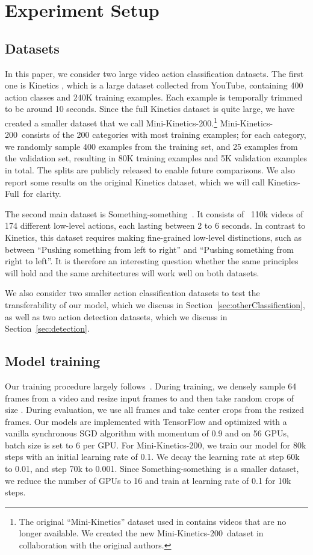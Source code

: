 \documentclass[runningheads]{llncs}
\newcommand{\MK}{Mini-Kinetics-200}
\newcommand{\Something}{Something-something}
\newcommand{\FK}{Kinetics-Full}
\begin{document}
 
\section{Experiment Setup}
\label{sec:experiments}
\subsection{Datasets}
\label{data}

In this paper, we consider two large video action classification datasets.
The first one is Kinetics \cite{kay2017kinetics},
  which  is a large dataset collected from YouTube,  containing 400 action classes and 240K training examples.
  Each example is temporally trimmed to be around 10 seconds.
  Since the full Kinetics dataset is quite large, 
  we have created a smaller dataset
that we call \MK.\footnote{
The original ``Mini-Kinetics'' dataset used in 
 \cite{kay2017kinetics} contains videos that are no longer available.
 We created the new \MK\ dataset in collaboration with the original authors.
} \MK\ consists of 
the 200 categories with most training examples;
for each category, we randomly sample 400 examples from the training set, and 25 examples from the validation set,
resulting in
80K training examples and 5K validation examples in total. The splits are publicly released to enable future comparisons.
We also report some results on the original Kinetics dataset, which we will call \FK\ for clarity.

The second main dataset is
\Something~\cite{Something}. It consists of ~110k videos of 174 different low-level actions, each lasting  between 2 to 6 seconds.
In contrast to Kinetics,
this dataset requires making fine-grained low-level distinctions, such as between ``Pushing something from left to right'' and ``Pushing something from right to left''.
It is therefore an interesting question whether the same principles will hold and the same architectures will work well on both datasets.

We also consider two 
smaller action classification datasets to test the transferability of our model, 
which we discuss in Section~\ref{sec:otherClassification},
as well as two 
action detection datasets, which we discuss in Section~\ref{sec:detection}.


\subsection{Model training}

Our training procedure largely follows~\cite{carreira2017quo}. During training, we densely sample 64 frames from a video and resize input frames to  and then take random crops of size . During evaluation, we use all frames and take  center crops from the resized frames. Our models are implemented with TensorFlow and optimized with a vanilla synchronous SGD algorithm with momentum of 0.9 and on 56 GPUs, batch size is set to 6 per GPU. For \MK, we train our model for 80k steps with an initial learning rate of 0.1. We decay the learning rate at step 60k to 0.01, and step 70k to 0.001. Since \Something\ is a smaller dataset, we reduce the number of GPUs to 16 and train at learning rate of 0.1 for 10k steps.
\end{document}
